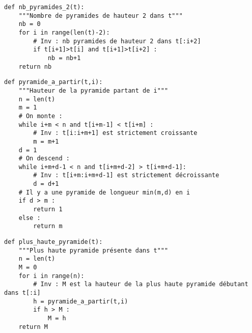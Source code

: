 \exer{}
\setcounter{numques}{0}

\question{} 
\begin{lstlisting}
def nb_pyramides_2(t):
    """Nombre de pyramides de hauteur 2 dans t"""
    nb = 0
    for i in range(len(t)-2):
        # Inv : nb pyramides de hauteur 2 dans t[:i+2]
        if t[i+1]>t[i] and t[i+1]>t[i+2] :
            nb = nb+1
    return nb
\end{lstlisting}

\question{}
\begin{lstlisting}
def pyramide_a_partir(t,i):
    """Hauteur de la pyramide partant de i"""
    n = len(t)
    m = 1
    # On monte :
    while i+m < n and t[i+m-1] < t[i+m] :
        # Inv : t[i:i+m+1] est strictement croissante
        m = m+1
    d = 1
    # On descend :
    while i+m+d-1 < n and t[i+m+d-2] > t[i+m+d-1]:
        # Inv : t[i+m:i+m+d-1] est strictement décroissante
        d = d+1
    # Il y a une pyramide de longueur min(m,d) en i
    if d > m : 
        return 1
    else :
        return m
\end{lstlisting}

\question{} 
\begin{lstlisting}
def plus_haute_pyramide(t):
    """Plus haute pyramide présente dans t"""
    n = len(t)
    M = 0
    for i in range(n):
        # Inv : M est la hauteur de la plus haute pyramide débutant dans t[:i]
        h = pyramide_a_partir(t,i)
        if h > M :
            M = h
    return M
\end{lstlisting}


